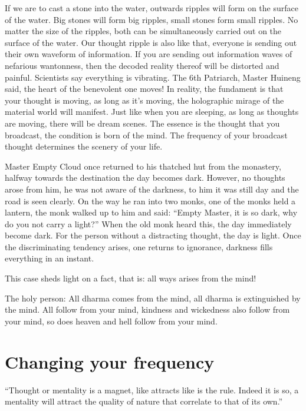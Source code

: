 \documentclass[
]{book}
\begin{document}
If we are to cast a stone into the water, outwards ripples will form on the surface of the water. Big stones will form big ripples, small stones form small ripples. No matter the size of the ripples, both can be simultaneously carried out on the surface of the water. Our thought ripple is also like that, everyone is sending out their own waveform of information. If you are sending out information waves of nefarious wantonness, then the decoded reality thereof will be distorted and painful. Scientists say everything is vibrating. The 6th Patriarch, Master Huineng said, the heart of the benevolent one moves! In reality, the fundament is that your thought is moving, as long as it's moving, the holographic mirage of the material world will manifest. Just like when you are sleeping, as long as thoughts are moving, there will be dream scenes. The essence is the thought that you broadcast, the condition is born of the mind. The frequency of your broadcast thought determines the scenery of your life.

Master Empty Cloud once returned to his thatched hut from the monastery, halfway towards the destination the day becomes dark. However, no thoughts arose from him, he was not aware of the darkness, to him it was still day and the road is seen clearly. On the way he ran into two monks, one of the monks held a lantern, the monk walked up to him and said: ``Empty Master, it is so dark, why do you not carry a light?'' When the old monk heard this, the day immediately become dark. For the person without a distracting thought, the day is light. Once the discriminating tendency arises, one returns to ignorance, darkness fills everything in an instant.

This case sheds light on a fact, that is: all ways arises from the mind!

The holy person: All dharma comes from the mind, all dharma is extinguished by the mind. All follow from your mind, kindness and wickedness also follow from your mind, so does heaven and hell follow from your mind.

\hypertarget{changing-your-frequency}{%
\section{Changing your frequency}\label{changing-your-frequency}}

``Thought or mentality is a magnet, like attracts like is the rule. Indeed it is so, a mentality will attract the quality of nature that correlate to that of its own.''
\end{document}

